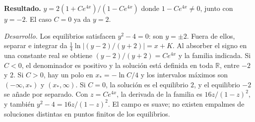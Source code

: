 \noindent\textbf{Resultado.} $y=2(1+Ce^{4x})/(1-Ce^{4x})$ donde $1-Ce^{4x}\ne0$, junto con $y=-2$. El caso $C=0$ ya da $y=2$.

\noindent\textit{Desarrollo.} Los equilibrios satisfacen $y^2-4=0$: son $y=\pm2$. Fuera de ellos, separar e integrar da $\tfrac14\ln|(y-2)/(y+2)|=x+K$. Al absorber el signo en una constante real se obtiene $(y-2)/(y+2)=Ce^{4x}$ y la familia indicada. Si $C<0$, el denominador es positivo y la solución está definida en toda $\mathbb R$, entre $-2$ y $2$. Si $C>0$, hay un polo en $x_*=-\ln C/4$ y los intervalos máximos son $(-\infty,x_*)$ y $(x_*,\infty)$. Si $C=0$, la solución es el equilibrio $2$, y el equilibrio $-2$ se añade por separado. Con $z=Ce^{4x}$, la derivada de la familia es $16z/(1-z)^2$, y también $y^2-4=16z/(1-z)^2$. El campo es suave; no existen empalmes de soluciones distintas en puntos finitos de los equilibrios.
